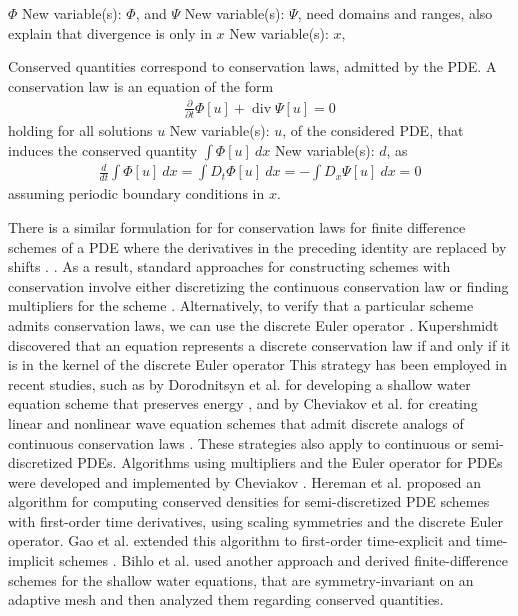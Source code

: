 \documentclass[runningheads]{llncs}
\newcommand{\1}{\chi}
\begin{document}
{\color{red} \(\Phi\)
{\color{blue} New variable(s): \(\Phi\),  }
 and \(\Psi\)
{\color{blue} New variable(s): \(\Psi\),  }
 need domains and ranges, also explain that divergence is only in \(x\)
{\color{blue} New variable(s): \(x\),  }
}

Conserved quantities correspond to conservation laws, admitted by the PDE. A conservation law \cite{cheviakov20} is an equation of the form
\begin{gather*}
	\frac{\partial }{\partial t}\Phi[u]+\operatorname{div} \Psi[u]=0
\end{gather*}
holding for all solutions \(u\)
{\color{blue} New variable(s): \(u\),  }
 of the considered PDE,
that induces the conserved quantity \(\int \Phi[u]\ dx\)
{\color{blue} New variable(s): \(d\),  }
 as
\begin{gather*}
	\frac{d}{dt}\int \Phi[u]\ dx=\int D_t\Phi[u]\ dx=-\int D_x\Psi[u]\ dx=0
\end{gather*}
assuming periodic boundary conditions in \(x\).

There is a similar formulation for
for conservation laws for finite difference schemes of a PDE  where the derivatives in the preceding identity are replaced by shifts \cite{hydon01}.  . As a result, standard approaches for constructing schemes with conservation involve either discretizing the continuous conservation law or finding multipliers for the scheme \cite{dorodnitsyn21}.
Alternatively, 
to verify that a particular scheme admits conservation laws, we can use the  discrete Euler operator \cite{cheviakov20}. Kupershmidt \cite[II. Theorem 31]{kupershmidt85} discovered that an equation represents a discrete conservation law if and only if it is in the kernel of the discrete Euler operator
This strategy has been employed in recent studies, such as by Dorodnitsyn et al. for developing a shallow water equation scheme that preserves energy \cite{dorodnitsyn21}, and by Cheviakov et al. for creating linear and nonlinear wave equation schemes that admit discrete analogs of continuous conservation laws \cite{cheviakov20}.
These strategies also apply to continuous or semi-discretized PDEs. Algorithms using multipliers and the Euler operator for PDEs were developed and implemented by Cheviakov \cite{cheviakov07,cheviakov10}. Hereman et al. \cite{hereman04,hereman08} proposed an algorithm for computing conserved densities for semi-discretized PDE schemes with first-order time derivatives, using scaling symmetries and the discrete Euler operator. Gao et al. extended this algorithm to first-order time-explicit \cite{gao02} and time-implicit schemes \cite{gao04}.
Bihlo et al. \cite{bihlo12} used another approach and derived finite-difference schemes for the shallow water equations, that are symmetry-invariant on an adaptive mesh and then analyzed them regarding conserved quantities.
\end{document}
